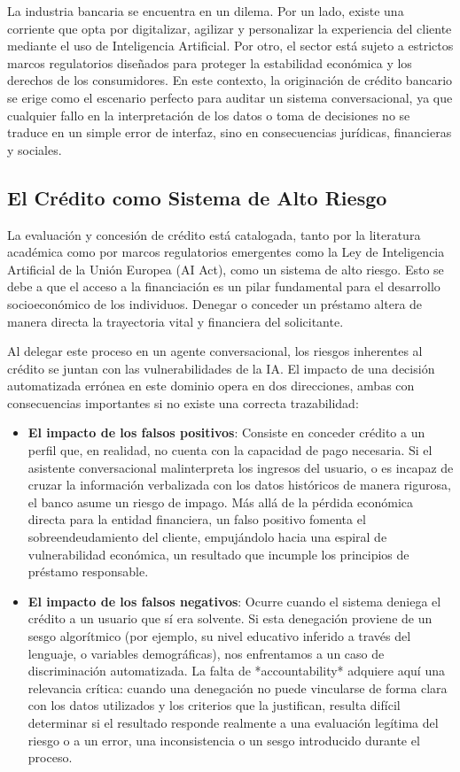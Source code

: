 \documentclass[12pt,a4paper]{report}
\begin{document}
La industria bancaria se encuentra en un dilema. Por un lado, existe una corriente que opta por digitalizar, agilizar y personalizar la experiencia del cliente mediante el uso de Inteligencia Artificial. Por otro, el sector está sujeto a estrictos marcos regulatorios diseñados para proteger la estabilidad económica y los derechos de los consumidores. En este contexto, la originación de crédito bancario se erige como el escenario perfecto para auditar un sistema conversacional, ya que cualquier fallo en la interpretación de los datos o toma de decisiones no se traduce en un simple error de interfaz, sino en consecuencias jurídicas, financieras y sociales.

\subsection{El Crédito como Sistema de Alto Riesgo}

La evaluación y concesión de crédito está catalogada, tanto por la literatura académica como por marcos regulatorios emergentes como la Ley de Inteligencia Artificial de la Unión Europea (AI Act), como un sistema de alto riesgo. Esto se debe a que el acceso a la financiación es un pilar fundamental para el desarrollo socioeconómico de los individuos. Denegar o conceder un préstamo altera de manera directa la trayectoria vital y financiera del solicitante.

Al delegar este proceso en un agente conversacional, los riesgos inherentes al crédito se juntan con las vulnerabilidades de la IA. El impacto de una decisión automatizada errónea en este dominio opera en dos direcciones, ambas con consecuencias importantes si no existe una correcta trazabilidad:

\begin{itemize}
    \item \textbf{El impacto de los falsos positivos}: Consiste en conceder crédito a un perfil que, en realidad, no cuenta con la capacidad de pago necesaria. Si el asistente conversacional malinterpreta los ingresos del usuario, o es incapaz de cruzar la información verbalizada con los datos históricos de manera rigurosa, el banco asume un riesgo de impago. Más allá de la pérdida económica directa para la entidad financiera, un falso positivo fomenta el sobreendeudamiento del cliente, empujándolo hacia una espiral de vulnerabilidad económica, un resultado que incumple los principios de préstamo responsable.

    \item \textbf{El impacto de los falsos negativos}: Ocurre cuando el sistema deniega el crédito a un usuario que sí era solvente. Si esta denegación proviene de un sesgo algorítmico (por ejemplo, su nivel educativo inferido a través del lenguaje, o variables demográficas), nos enfrentamos a un caso de discriminación automatizada. La falta de *accountability* adquiere aquí una relevancia crítica: cuando una denegación no puede vincularse de forma clara con los datos utilizados y los criterios que la justifican, resulta difícil determinar si el resultado responde realmente a una evaluación legítima del riesgo o a un error, una inconsistencia o un sesgo introducido durante el proceso.
\end{itemize}
\end{document}
